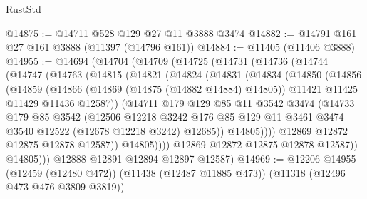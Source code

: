 \begin{lexlean}{RustStd}
\begin{coremodule}
@14875 := @14711 @528 @129 @27 @11 @3888 @3474
@14882 := @14791 @161 @27 @161 @3888 (@11397 (@14796 @161))
@14884 := @11405 (@11406 @3888)
@14955 := @14694
    (@14704
      (@14709
        (@14725
          (@14731
            (@14736
              (@14744
                (@14747
                  (@14763
                    (@14815
                      (@14821
                        (@14824
                          (@14831
                            (@14834
                              (@14850
                                (@14856
                                  (@14859
                                    (@14866
                                      (@14869 (@14875 (@14882 @14884) @14805))
                                      @11421
                                      @11425
                                      @11429
                                      @11436
                                      @12587))
                                  (@14711
                                    @179
                                    @129
                                    @85
                                    @11
                                    @3542
                                    @3474
                                    (@14733
                                      @179
                                      @85
                                      @3542
                                      (@12506
                                        @12218
                                        @3242
                                        @176
                                        @85
                                        @129
                                        @11
                                        @3461
                                        @3474
                                        @3540
                                        @12522
                                        (@12678 @12218 @3242)
                                        @12685))
                                    @14805))))
                            @12869
                            @12872
                            @12875
                            @12878
                            @12587))
                        @14805))))
                @12869
                @12872
                @12875
                @12878
                @12587))
            @14805)))
      @12888
      @12891
      @12894
      @12897
      @12587)
@14969 := @12206
    @14955
    (@12459 (@12480 @472))
    (@11438 (@12487 @11885 @473))
    (@11318 (@12496 @473 @476 @3809 @3819))

\end{coremodule}
\end{lexlean}
